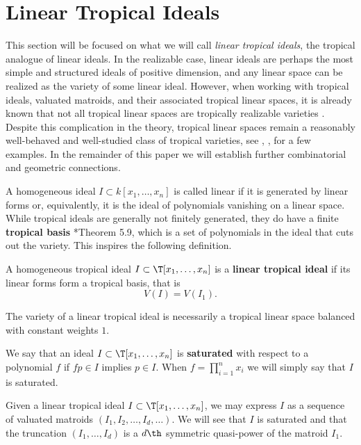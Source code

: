 \section{Linear Tropical Ideals}\label{sec:LinTropIdeals}
 

   This section will be focused on what we will call \textit{linear tropical ideals}, the tropical analogue of linear ideals. In the realizable case, linear ideals are perhaps the most simple and structured ideals of positive dimension, and any linear space can be realized as the variety of some linear ideal. However, when working with tropical ideals, valuated matroids, and their associated tropical linear spaces, it is already known that not all tropical linear spaces are tropically realizable varieties \cite{DR19}. Despite this complication in the theory, tropical linear spaces remain a reasonably well-behaved and well-studied class of tropical varieties, see \cite{Speyer08}, \cite{FR15}, \cite{GG18} for a few examples. In the remainder of this paper we will establish further combinatorial and geometric connections.
   
   A homogeneous ideal $I\subset k[x_1,\dots,x_n]$ is called linear if it is generated by linear forms or, equivalently, it is the ideal of polynomials vanishing on a linear space. While tropical ideals are generally not finitely generated, they do have a finite \textbf{tropical basis} \cite{MR18}*{Theorem 5.9}, which is a set of polynomials in the ideal that cuts out the variety. This inspires the following definition.
   
    \begin{definition}    
    A homogeneous tropical ideal $I\subset \T[x_1,\dots, x_n]$ is a \textbf{linear tropical ideal} if its linear forms form a tropical basis, that is
    $$V(I)= V(I_1).$$
    \end{definition}
    The variety of a linear tropical ideal is necessarily a tropical linear space balanced with constant weights $1$.

    We say that an ideal $I\subset \T[x_1,\dots,x_n]$ is \textbf{saturated} with respect to a polynomial $f$ if $fp\in I$ implies $p\in I$. When $f=\prod_{i=1}^n x_i$ we will simply say that $I$ is saturated.
    
    \begin{remark}\label{rem:linSaturated}
    Given a linear tropical ideal $I\subset \T[x_1,\dots, x_n]$, we may express $I$ as a sequence of valuated matroids $(I_1,I_2,\dots,I_d,\dots)$. We will see that $I$ is saturated and that the truncation $(I_1,\dots,I_d)$ is a $d\th$ symmetric quasi-power of the matroid $I_1$.
    \end{remark}

